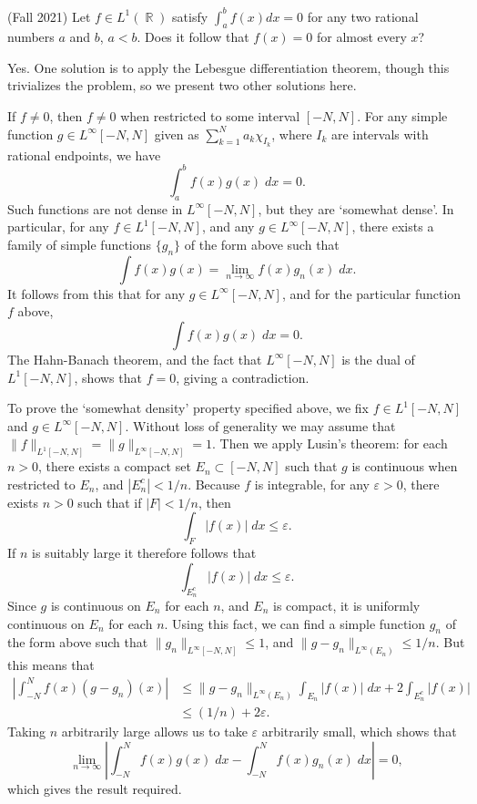 \documentclass[answers]{exam}
\DeclareMathOperator{\RR}{\mathbb{R}}
\begin{document}
\begin{questions}
\question (Fall 2021) Let $f\in L^1(\RR)$  satisfy $\int_{a}^{b}f(x)dx=0$
for any two rational numbers $a$ and $b$, $a<b$. Does it follow that $f(x)=0$
for almost every $x$?

\begin{solution}
	Yes. One solution is to apply the Lebesgue differentiation theorem, though this trivializes the problem, so we present two other solutions here.

	If $f \neq 0$, then $f \neq 0$ when restricted to some interval $[-N,N]$. For any simple function $g \in L^\infty[-N,N]$ given as $\sum_{k = 1}^N a_k \chi_{I_k}$, where $I_k$ are intervals with rational endpoints, we have
	\[ \int_a^b f(x) g(x)\; dx = 0. \]
	Such functions are not dense in $L^\infty[-N,N]$, but they are `somewhat dense'. In particular, for any $f \in L^1[-N,N]$, and any $g \in L^\infty[-N,N]$, there exists a family of simple functions $\{ g_n \}$ of the form above such that
	\[ \int f(x) g(x) = \lim_{n \to \infty} f(x) g_n(x)\; dx. \]
	It follows from this that for any $g \in L^\infty[-N,N]$, and for the particular function $f$ above,
	\[ \int f(x) g(x)\; dx = 0. \]
	The Hahn-Banach theorem, and the fact that $L^\infty[-N,N]$ is the dual of $L^1[-N,N]$, shows that $f = 0$, giving a contradiction.

	To prove the `somewhat density' property specified above, we fix $f \in L^1[-N,N]$ and $g \in L^\infty[-N,N]$. Without loss of generality we may assume that $\| f \|_{L^1[-N,N]} = \| g \|_{L^\infty[-N,N]} = 1$. Then we apply Lusin's theorem: for each $n > 0$, there exists a compact set $E_n \subset [-N,N]$ such that $g$ is continuous when restricted to $E_n$, and $|E_n^c| < 1/n$. Because $f$ is integrable, for any $\varepsilon > 0$, there exists $n > 0$ such that if $|F| < 1/n$, then
	\[ \int_{F} |f(x)|\; dx \leq \varepsilon. \]
	If $n$ is suitably large it therefore follows that
	\[ \int_{E_n^c} |f(x)|\; dx \leq \varepsilon. \]
	Since $g$ is continuous on $E_n$ for each $n$, and $E_n$ is compact, it is uniformly continuous on $E_n$ for each $n$. Using this fact, we can find a simple function $g_n$ of the form above such that $\| g_n \|_{L^\infty[-N,N]} \leq 1$, and $\| g - g_n \|_{L^\infty(E_n)} \leq 1/n$. But this means that 
	\begin{align*}
		\left| \int_{-N}^N f(x) (g - g_n)(x) \right| &\leq \| g - g_n \|_{L^\infty(E_n)} \int_{E_n} |f(x)|\; dx + 2 \int_{E_n^c} |f(x)|\\
		&\leq (1/n) + 2 \varepsilon.
	\end{align*}
	Taking $n$ arbitrarily large allows us to take $\varepsilon$ arbitrarily small, which shows that
	\[ \lim_{n \to \infty} \left| \int_{-N}^N f(x) g(x)\; dx - \int_{-N}^N f(x) g_n(x)\; dx \right| = 0, \]
	which gives the result required.


\end{solution}
\end{questions}
\end{document}
